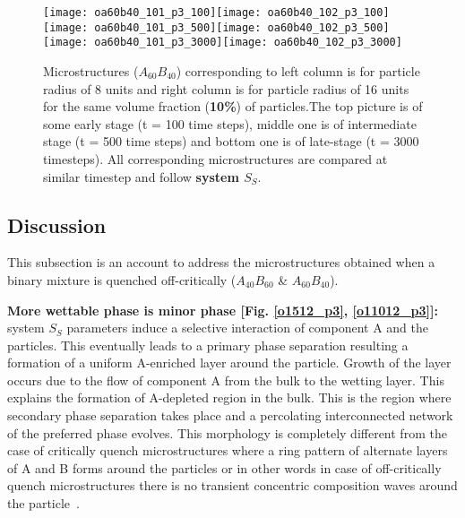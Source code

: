 \documentclass[12pt]{iiscthes}
\theoremstyle{definition}
\theoremstyle{definition}
\theoremstyle{remark}
\begin{document}
 \begin{figure}[H]
\begin{center}
\texttt{[image: oa60b40\_101\_p3\_100]}\texttt{[image: oa60b40\_102\_p3\_100]}\\
\texttt{[image: oa60b40\_101\_p3\_500]}\texttt{[image: oa60b40\_102\_p3\_500]}\\
\texttt{[image: oa60b40\_101\_p3\_3000]}\texttt{[image: oa60b40\_102\_p3\_3000]}\\
\caption{Microstructures ($A_{60}B_{40}$) corresponding to left column is for particle radius of 8 units and right column is for particle radius of 16 units for the same volume fraction (\textbf{10\%}) of particles.The top picture is of some early stage (t = 100 time steps), middle one is of intermediate stage (t = 500 time steps) and bottom one is of late-stage (t = 3000 timesteps). All corresponding microstructures are compared at similar timestep and follow \textbf{system $S_S$}.}\label{o21012_p3}
\end{center}
\end{figure}
\subsection{Discussion}
This subsection is an account to address the microstructures obtained when a binary mixture is quenched off-critically ($A_{40}B_{60}$ \& $A_{60}B_{40}$). 

\textbf{More wettable phase is minor phase [Fig. \ref{o1512_p3}, \ref{o11012_p3}]:} system $S_S$ parameters induce a selective interaction of component A and the particles. This eventually leads to a primary phase separation resulting a formation of a uniform A-enriched layer around the particle. Growth of the layer occurs due to the flow of component A from the bulk to the wetting layer. This explains the formation of A-depleted region in the bulk. This is the region where secondary phase separation takes place and a percolating interconnected network of the preferred phase evolves. This morphology is completely different from the case of critically quench microstructures where a ring pattern of alternate layers of A and B forms around the particles or in other words in case of off-critically quench microstructures there is no transient concentric composition waves around the particle~\cite{Lee}. 
\end{document}
